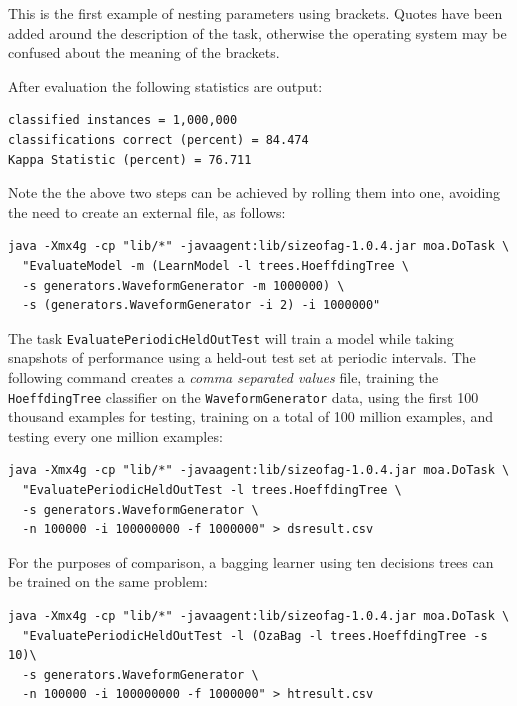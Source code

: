 \documentclass[a4paper,12pt,twoside]{book}
\begin{document}
This is the first example of nesting parameters using brackets. Quotes have been added around the description of the task, otherwise the operating system may be confused about the meaning of the brackets.

After evaluation the following statistics are output:

\begin{footnotesize}\begin{verbatim}
classified instances = 1,000,000
classifications correct (percent) = 84.474
Kappa Statistic (percent) = 76.711
\end{verbatim}\end{footnotesize}

Note the the above two steps can be achieved by rolling them into one, avoiding the need to create an external file, as follows:

\begin{footnotesize}\begin{verbatim}
java -Xmx4g -cp "lib/*" -javaagent:lib/sizeofag-1.0.4.jar moa.DoTask \
  "EvaluateModel -m (LearnModel -l trees.HoeffdingTree \
  -s generators.WaveformGenerator -m 1000000) \
  -s (generators.WaveformGenerator -i 2) -i 1000000"
\end{verbatim}\end{footnotesize}

The task \verb+EvaluatePeriodicHeldOutTest+ will train a model while taking snapshots of performance using a held-out test set at periodic intervals.
The following command creates a {\em comma separated values} file, training the \verb+HoeffdingTree+ classifier on the \verb+WaveformGenerator+ data, using the first 100 thousand examples for testing, training on a total of 100 million examples, and testing every one million examples:

\begin{footnotesize}\begin{verbatim}
java -Xmx4g -cp "lib/*" -javaagent:lib/sizeofag-1.0.4.jar moa.DoTask \
  "EvaluatePeriodicHeldOutTest -l trees.HoeffdingTree \
  -s generators.WaveformGenerator \
  -n 100000 -i 100000000 -f 1000000" > dsresult.csv
\end{verbatim}\end{footnotesize}

  For the purposes of comparison, a bagging learner using ten decisions trees can be trained on
the same problem:
\begin{footnotesize}\begin{verbatim}
java -Xmx4g -cp "lib/*" -javaagent:lib/sizeofag-1.0.4.jar moa.DoTask \
  "EvaluatePeriodicHeldOutTest -l (OzaBag -l trees.HoeffdingTree -s 10)\
  -s generators.WaveformGenerator \
  -n 100000 -i 100000000 -f 1000000" > htresult.csv
\end{verbatim}\end{footnotesize}
\end{document}
